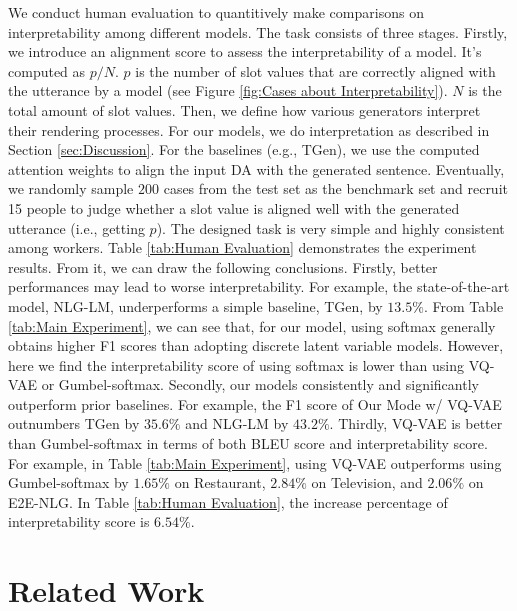 \documentclass[letterpaper]{article} %
\begin{document}
We conduct human evaluation to quantitively make comparisons on interpretability among different models. The task consists of three stages. Firstly, we introduce an alignment score to assess the interpretability of a model. It's computed as $p / N$. $p$ is the number of slot values that are correctly aligned with the utterance by a model (see Figure \ref{fig:Cases about Interpretability}). $N$ is the total amount of slot values. Then, we define how various generators interpret their rendering processes. For our models, we do interpretation as described in Section \ref{sec:Discussion}. For the baselines (e.g., TGen), we use the computed attention weights to align the input DA with the generated sentence. Eventually, we randomly sample $200$ cases from the test set as the benchmark set and recruit 15 people to judge whether a slot value is aligned well with the generated utterance (i.e., getting $p$). The designed task is very simple and highly consistent among workers.  Table \ref{tab:Human Evaluation} demonstrates the experiment results. From it, we can draw the following conclusions. Firstly, better performances may lead to worse interpretability. For example, the state-of-the-art model, NLG-LM, underperforms a simple baseline, TGen, by $13.5\%$. From Table \ref{tab:Main Experiment}, we can see that, for our model, using softmax generally obtains higher F1 scores than adopting discrete latent variable models. However, here we find the interpretability score of using softmax is lower than using VQ-VAE or Gumbel-softmax. Secondly, our models consistently and significantly outperform prior baselines. For example, the F1 score of Our Mode w/ VQ-VAE outnumbers TGen by $35.6\%$ and NLG-LM by $43.2\%$. Thirdly, VQ-VAE is better than Gumbel-softmax in terms of both BLEU score and interpretability score. For example, in Table \ref{tab:Main Experiment}, using VQ-VAE outperforms using Gumbel-softmax by $1.65\%$ on Restaurant, $2.84\%$ on Television, and $2.06\%$ on E2E-NLG. In Table \ref{tab:Human Evaluation}, the increase percentage of interpretability score is $6.54\%$.

\vspace{-3.16mm}
\section{Related Work}
\end{document}
